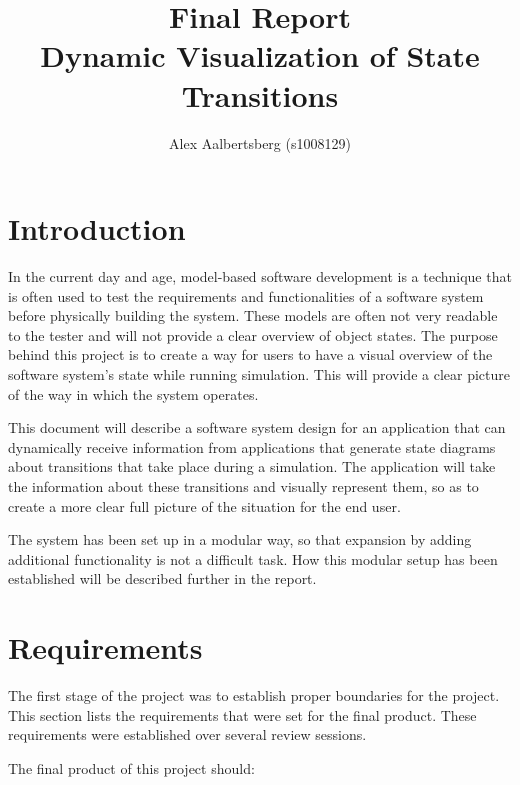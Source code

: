 \documentclass[11pt,a4paper]{article}
\begin{document}
\title{Final Report \\ \vspace{2mm} {\large Dynamic Visualization of State Transitions}}
\author{Alex Aalbertsberg (s1008129)}
\maketitle

\clearpage
\tableofcontents

\clearpage
\section{Introduction}

In the current day and age, model-based software development is a technique that is often used to test the requirements and functionalities of a software system before physically building the system. These models are often not very readable to the tester and will not provide a clear overview of object states. The purpose behind this project is to create a way for users to have a visual overview of the software system's state while running simulation. This will provide a clear picture of the way in which the system operates.

This document will describe a software system design for an application that can dynamically receive information from applications that generate state diagrams about transitions that take place during a simulation. The application will take the information about these transitions and visually represent them, so as to create a more clear full picture of the situation for the end user.

The system has been set up in a modular way, so that expansion by adding additional functionality is not a difficult task. How this modular setup has been established will be described further in the report.

\section{Requirements}

The first stage of the project was to establish proper boundaries for the project. This section lists the requirements that were set for the final product. These requirements were established over several review sessions.

The final product of this project should:
\end{document}
